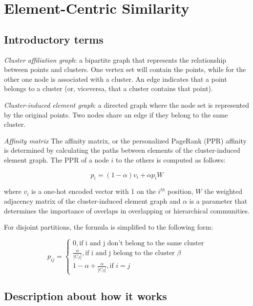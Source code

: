 \section{Element-Centric Similarity}
    \subsection{Introductory terms}
    \textit{Cluster affiliation graph}: a bipartite graph that represents the relationship between points and clusters. One vertex set will contain the points, while for the other one node is associated with a cluster. An edge indicates that a point belongs to a cluster (or, viceversa, that a cluster contains that point).
    
    \textit{Cluster-induced element graph}: a directed graph where the node set is represented by the original points. Two nodes share an edge if they belong to the same cluster.

    \textit{Affinity matrix} The affinity matrix, or the personalized PageRank (PPR) affinity is determined by calculating the paths between elements of the cluster-induced element graph. The PPR of a node $i$ to the others is computed as follows:

    \[ p_i = (1 - \alpha) v_i + \alpha p_i W \]

    where $v_i$ is a one-hot encoded vector with 1 on the $i^{th}$ position, $W$ the weighted adjacency matrix of the cluster-induced element graph and $\alpha$ is a parameter that determines the importance of overlaps in overlapping or hierarchical communities.

    For disjoint partitions, the formula is simplified to the following form:

    \begin{equation} \label{eq:affinity-disjoin}
        p_{ij} = 
        \begin{cases}
            0, \text{if i and j don't belong to the same cluster} \\
            \frac{\alpha}{|C_\beta|}, \text{if i and j belong to the cluster } \beta \\
            1 - \alpha + \frac{\alpha}{|C_\beta|}, \text{if } i = j
        \end{cases}
    \end{equation}
    
    \subsection{Description about how it works}

